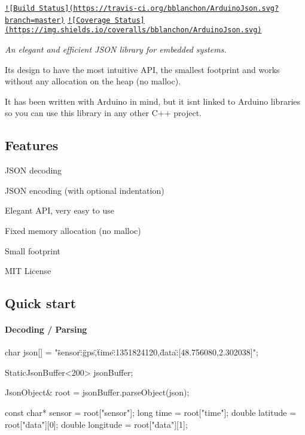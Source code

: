 \href{https://travis-ci.org/bblanchon/ArduinoJson}{\tt !\mbox{[}Build Status\mbox{]}(https\+://travis-\/ci.\+org/bblanchon/\+Arduino\+Json.\+svg?branch=master)} \href{https://coveralls.io/r/bblanchon/ArduinoJson?branch=master}{\tt !\mbox{[}Coverage Status\mbox{]}(https\+://img.\+shields.\+io/coveralls/bblanchon/\+Arduino\+Json.\+svg)}

{\itshape An elegant and efficient J\+S\+O\+N library for embedded systems.}

It\textquotesingle{}s design to have the most intuitive A\+P\+I, the smallest footprint and works without any allocation on the heap (no malloc).

It has been written with Arduino in mind, but it isn\textquotesingle{}t linked to Arduino libraries so you can use this library in any other C++ project.

\subsection*{Features }


\begin{DoxyItemize}
\item J\+S\+O\+N decoding
\item J\+S\+O\+N encoding (with optional indentation)
\item Elegant A\+P\+I, very easy to use
\item Fixed memory allocation (no malloc)
\item Small footprint
\item M\+I\+T License
\end{DoxyItemize}

\subsection*{Quick start }

\paragraph*{Decoding / Parsing}

\begin{DoxyVerb}char json[] = "{\"sensor\":\"gps\",\"time\":1351824120,\"data\":[48.756080,2.302038]}";

StaticJsonBuffer<200> jsonBuffer;

JsonObject& root = jsonBuffer.parseObject(json);

const char* sensor = root["sensor"];
long time          = root["time"];
double latitude    = root["data"][0];
double longitude   = root["data"][1];
\end{DoxyVerb}


